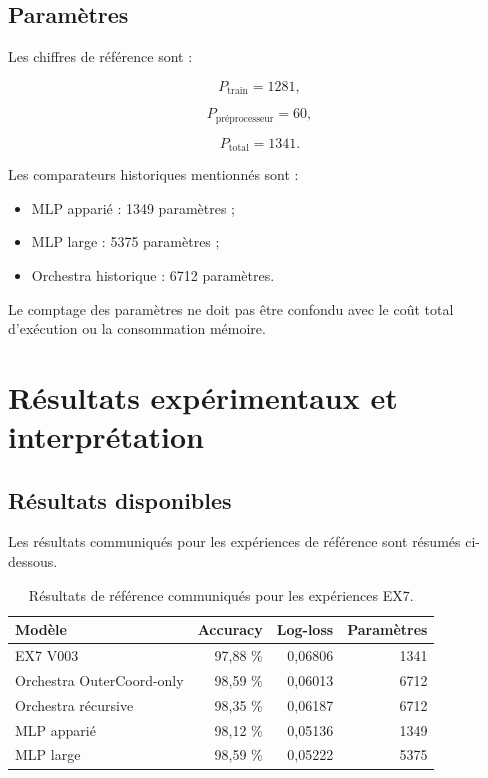 \documentclass[11pt,a4paper]{report}
\begin{document}
\section{Paramètres}

Les chiffres de référence sont :

\[
P_{\mathrm{train}}=1281,
\]

\[
P_{\mathrm{préprocesseur}}=60,
\]

\[
P_{\mathrm{total}}=1341.
\]

Les comparateurs historiques mentionnés sont :

\begin{itemize}
  \item MLP apparié : 1349 paramètres ;
  \item MLP large : 5375 paramètres ;
  \item Orchestra historique : 6712 paramètres.
\end{itemize}

Le comptage des paramètres ne doit pas être confondu
avec le coût total d'exécution ou la consommation mémoire.

\chapter{Résultats expérimentaux et interprétation}

\section{Résultats disponibles}

Les résultats communiqués pour les expériences de référence
sont résumés ci-dessous.

\begin{table}[H]
\centering
\small
\begin{tabularx}{\textwidth}{
  >{\raggedright\arraybackslash}X
  r r r
}
\toprule
Modèle & Accuracy & Log-loss & Paramètres\\
\midrule
EX7 V003 & 97,88 \% & 0,06806 & 1341\\
Orchestra OuterCoord-only & 98,59 \% & 0,06013 & 6712\\
Orchestra récursive & 98,35 \% & 0,06187 & 6712\\
MLP apparié & 98,12 \% & 0,05136 & 1349\\
MLP large & 98,59 \% & 0,05222 & 5375\\
\bottomrule
\end{tabularx}
\caption{Résultats de référence communiqués pour les expériences EX7.}
\end{table}
\end{document}
